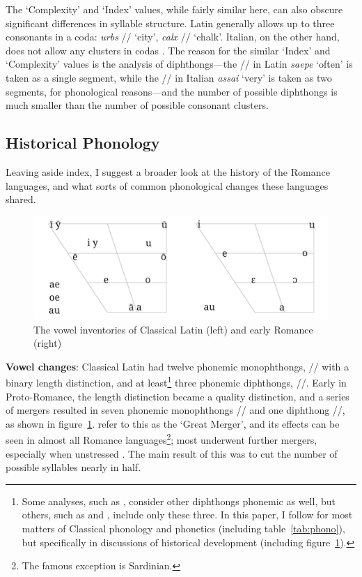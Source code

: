 \documentclass[12pt,twoside,leqno]{article} %
\newcommand{\ipa}[1]{/\textipa{#1}/}
\begin{document}
The `Complexity' and `Index' values, while fairly similar here, can also obscure significant differences in syllable structure. Latin generally allows up to three consonants in a coda: \emph{urbs} \ipa{urps} `city', \emph{calx} \ipa{kalks} `chalk'. Italian, on the other hand, does not allow any clusters in codas \citep{hall}. The reason for the similar `Index' and `Complexity' values is the analysis of diphthongs---the \ipa{a\textsubarch{e}} in Latin \emph{saepe} `often' is taken as a single segment, while the \ipa{a\textsubarch{i}} in Italian \emph{assai} `very' is taken as two segments, for phonological reasons---and the number of possible diphthongs is much smaller than the number of possible consonant clusters.

\subsection{Historical Phonology}

Leaving aside  index, I suggest a broader look at the history of the Romance languages, and what sorts of common phonological changes these languages shared.

\begin{figure}[h]
\centering
\caption{The vowel inventories of Classical Latin (left) and early Romance (right)}
\label{fig:vowels}
\noindent\includegraphics[width=\linewidth]{vowelchange}
\end{figure}

\textbf{Vowel changes}: Classical Latin had twelve phonemic monophthongs, \ipa{i y e a o u} with a binary length distinction, and at least\footnote{Some analyses, such as \citet{allen}, consider other diphthongs phonemic as well, but others, such as \citet{alkire} and \citet{boyd}, include only these three. In this paper, I follow \citeauthor{allen} for most matters of Classical phonology and phonetics (including table~\ref{tab:phono}), but \citet{alkire} specifically in discussions of historical development (including figure~\ref{fig:vowels}).} three phonemic diphthongs, \ipa{a\textsubarch{e} o\textsubarch{e} a\textsubarch{u}}. Early in Proto-Romance, the length distinction became a quality distinction, and a series of mergers resulted in seven phonemic monophthongs \ipa{i e E a O o u} and one diphthong \ipa{a\textsubarch{u}}, as shown in figure~\ref{fig:vowels}. \citet{alkire} refer to this as the `Great Merger', and its effects can be seen in almost all Romance languages\footnote{The famous exception is Sardinian.}; most underwent further mergers, especially when unstressed \citep{boyd,alkire}. The main result of this was to cut the number of possible syllables nearly in half.
\end{document}
